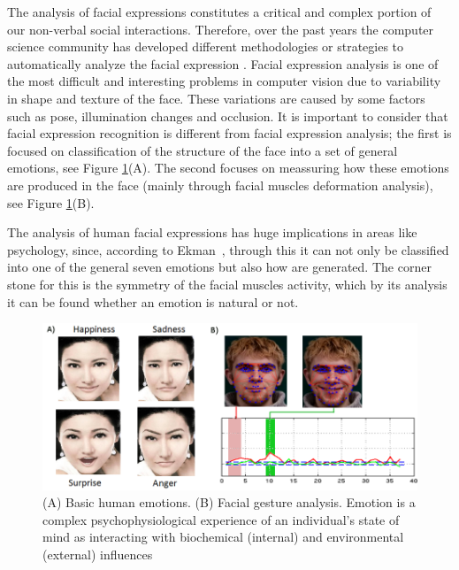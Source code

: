 The analysis of facial expressions constitutes a critical and complex portion of our non-verbal social interactions. Therefore, over the past years the computer science community has developed different methodologies or strategies to automatically analyze the facial expression \cite{Fasel01}. %
Facial expression analysis is one of the most difficult and interesting problems in computer vision due to variability in shape and texture of the face. These variations are caused by some factors such as pose, illumination changes and occlusion. It is important to consider that facial expression recognition is different from facial expression analysis; the first is focused on classification of the structure of the face into a set of general emotions, see Figure \ref{fig:BasicEmotions}(A). The second focuses on meassuring how these emotions are produced in the face (mainly through facial muscles deformation analysis), see Figure \ref{fig:BasicEmotions}(B).

The analysis of human facial expressions has huge implications in areas like psychology, since, according to Ekman~\cite{Hager1979}, through this it can not only be classified into one of the general seven emotions but also how are generated. The corner stone for this is the symmetry of the facial muscles activity, which by its analysis it can be found whether an emotion is natural or not.

\begin{figure}[h]
    \centering
    \includegraphics[scale=0.4]{images/emotionsAndGraphics1.png}
    \caption[Basic human emotions and Facial gesture analysis]{(A) Basic human emotions. (B) Facial gesture analysis. Emotion is a complex psychophysiological experience of an individual's state of mind as interacting with biochemical (internal) and environmental (external) influences}
    \label{fig:BasicEmotions}
\end{figure}

